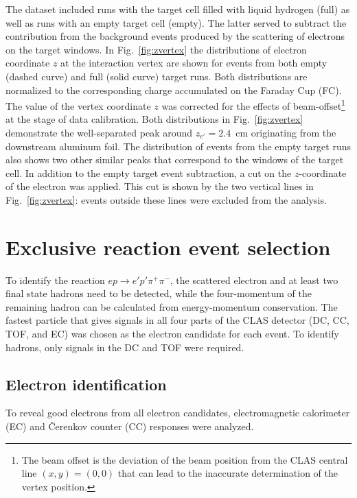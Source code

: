 \documentclass[prc,twocolumn,superscriptaddress,showpacs,amssymb,amsmath,amsfonts,aps,nofootinbib]{revtex4-1}
\begin{document}
The dataset included runs with the target cell filled with liquid hydrogen (full) as well as runs with an empty target cell (empty). The latter served to subtract the contribution from the background events produced  by the scattering of electrons on the target windows. 
In Fig.~\ref{fig:zvertex} the distributions of electron coordinate $z$ at the interaction vertex are shown for events from both empty (dashed curve) and full (solid curve) target runs. Both distributions are normalized to the corresponding charge accumulated on the Faraday Cup (FC). The value of the vertex coordinate $z$ was corrected for the effects of beam-offset\footnote[2]{The beam offset is the deviation of the beam position from the CLAS central line $(x,y)=(0,0)$ that can lead to the inaccurate determination of the vertex position.} at the stage of data calibration. Both distributions in Fig.~\ref{fig:zvertex} demonstrate the well-separated peak around $z_{e'} = 2.4$~cm originating from the downstream aluminum foil. The distribution of events from the empty target runs also shows two other similar peaks that correspond to the windows of the target cell. In addition to the empty target event subtraction, a cut on the $z$-coordinate of the electron was applied. This cut is shown by the two vertical lines in Fig.~\ref{fig:zvertex}: events outside these lines were excluded from the analysis. 
 
\section{Exclusive reaction event selection}
\label{expt}

To identify the reaction $e p \rightarrow e' p' \pi^{+} \pi^{-}$, the scattered electron and at least two final state hadrons need to be detected, while the four-momentum of the remaining hadron can be calculated from energy-momentum conservation.
The fastest particle that gives signals in all four parts of the CLAS detector (DC, CC, TOF, and EC) was chosen as the electron candidate for each event. To identify hadrons, only signals in the DC and TOF were required. 


\subsection{Electron identification}

To reveal good electrons from all electron candidates,  electromagnetic calorimeter (EC) and \v Cerenkov counter (CC) responses were analyzed.
\end{document}
